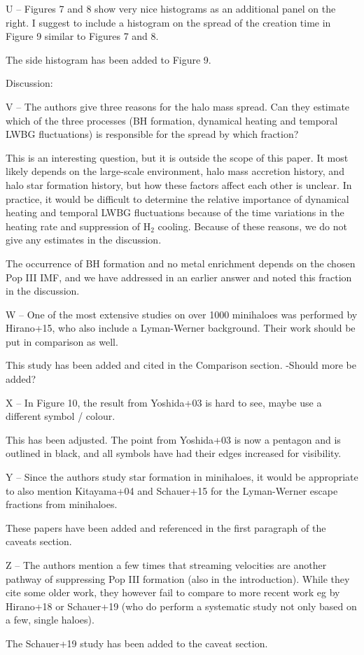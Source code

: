 \documentclass[11pt]{article}
\newenvironment{referee}[1][]{%
    \ignorespaces%
    \begin{mdframed}[style=myquotestyle,#1]%
}{%
    \end{mdframed}%
    \ignorespacesafterend%
}%
\begin{document}
\begin{referee}
U -- Figures 7 and 8 show very nice histograms as an additional panel on the right.  I suggest to include a histogram on the spread of the creation time in Figure 9 similar to Figures 7 and 8.
\end{referee}
The side histogram has been added to Figure 9. 

\begin{referee}
Discussion:

V -- The authors give three reasons for the halo mass spread. Can they estimate which of the three processes (BH formation, dynamical heating and temporal LWBG fluctuations) is responsible for the spread by which fraction?
\end{referee}

This is an interesting question, but it is outside the scope of this paper.  It most likely depends on the large-scale environment, halo mass accretion history, and halo star formation history, but how these factors affect each other is unclear.  In practice, it would be difficult to determine the relative importance of dynamical heating and temporal LWBG fluctuations because of the time variations in the heating rate and suppression of H$_2$ cooling.  Because of these reasons, we do not give any estimates in the discussion.

The occurrence of BH formation and no metal enrichment depends on the chosen Pop III IMF, and we have addressed in an earlier answer and noted this fraction in the discussion.

\begin{referee}
W -- One of the most extensive studies on over 1000 minihaloes was performed by Hirano+15, who also include a Lyman-Werner background. Their work should be put in comparison as well.
\end{referee}
This study has been added and cited in the Comparison section.
-Should more be added?

\begin{referee}
X -- In Figure 10, the result from Yoshida+03 is hard to see, maybe use a different symbol / colour.
\end{referee}
This has been adjusted. The point from Yoshida+03 is now a pentagon and is outlined in black, and all symbols have had their edges increased for visibility.

\begin{referee}
Y -- Since the authors study star formation in minihaloes, it would be appropriate to also mention Kitayama+04 and Schauer+15 for the Lyman-Werner escape fractions from minihaloes.
\end{referee}
These papers have been added and referenced in the first paragraph of the caveats section. 

\begin{referee}
Z -- The authors mention a few times that streaming velocities are another pathway of suppressing Pop III formation (also in the introduction). While they cite some older work, they however fail to compare to more recent work eg by Hirano+18 or Schauer+19 (who do perform a systematic study not only based on a few, single haloes).
\end{referee}
The Schauer+19 study has been added to the caveat section.
\end{document}
